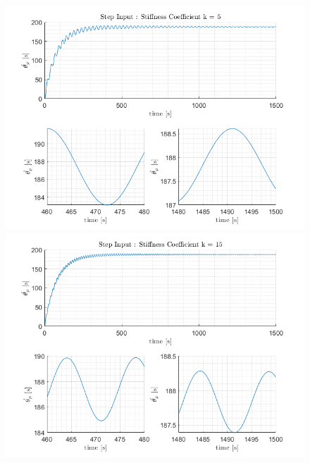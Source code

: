 \documentclass[letterpaper,12pt]{article}
\begin{document}
\begin{figure}[ht]
    \centering
    \includegraphics[scale = .8]{Images/StepInput_k5.png}
    \includegraphics[scale = .8]{Images/StepInput_k15.png}
\end{figure}
\end{document}
